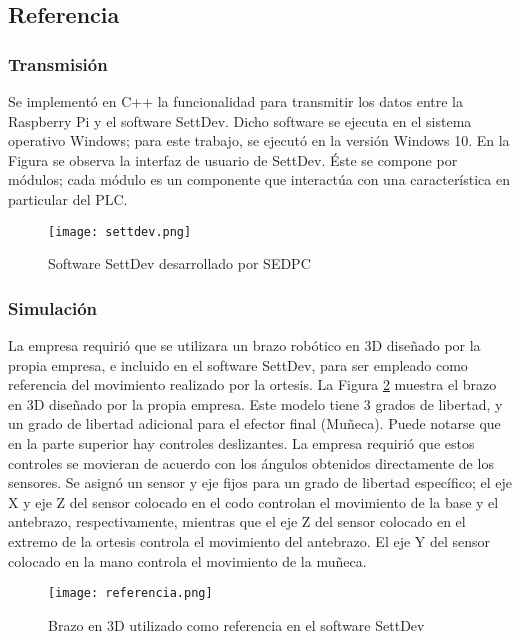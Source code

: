 \subsection{Referencia}

\subsubsection{Transmisión}

Se implementó en C++ la funcionalidad para transmitir los datos entre la Raspberry Pi y el software SettDev. Dicho software se ejecuta en el sistema operativo Windows; para este trabajo, se ejecutó en la versión Windows 10. En la Figura se observa la interfaz de usuario de SettDev. Éste se compone por módulos; cada módulo es un componente que interactúa con una característica en particular del PLC.

\begin{figure}[htb]
	\centering
	\texttt{[image: settdev.png]}
	\caption{Software SettDev desarrollado por SEDPC}
	\label{fig:settdev}
\end{figure}

\subsubsection{Simulación}

La empresa requirió que se utilizara un brazo robótico en 3D diseñado por la propia empresa, e incluido en el software SettDev, para ser empleado como referencia del movimiento realizado por la ortesis. La Figura \ref{fig:referencia} muestra el brazo en 3D diseñado por la propia empresa. Este modelo tiene 3 grados de libertad, y un grado de libertad adicional para el efector final (Muñeca). Puede notarse que en la parte superior hay controles deslizantes. La empresa requirió que estos controles se movieran de acuerdo con los ángulos obtenidos directamente de los sensores. Se asignó un sensor y eje fijos para un grado de libertad específico; el eje X y eje Z del sensor colocado en el codo controlan el movimiento de la base y el antebrazo, respectivamente, mientras que el eje Z del sensor colocado en el extremo de la ortesis controla el movimiento del antebrazo. El eje Y del sensor colocado en la mano controla el movimiento de la muñeca.

\begin{figure}[htb]
	\centering
	\texttt{[image: referencia.png]}
	\caption{Brazo en 3D utilizado como referencia en el software SettDev}
	\label{fig:referencia}
\end{figure}